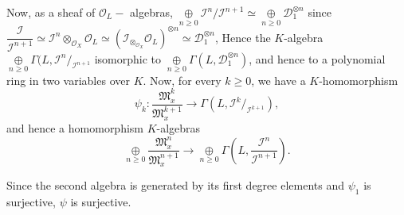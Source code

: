  Now, as a sheaf of $\mathscr{O}_L-$ algebras, $\underset{n \ge
   0}\oplus  \mathscr{I}^n / \mathscr{I}^{n+1} \simeq \underset{n \ge
   0} \oplus \mathscr{D}^{\otimes n}_1 $ since
 $\dfrac{\mathscr{I}}{\mathscr{I}^{n+1}} \simeq \mathscr{I}^n \otimes
 _{\mathscr{O}_X} \mathscr{O}_L \simeq(
 \mathscr{I}_{\otimes_{\mathscr{O}_X}} \mathscr{O}_L )^{\otimes n}
 \simeq \mathscr{D}_1^{\otimes n}$, Hence the $K$-algebra $\underset{n
   \ge 0}\oplus \Gamma (L, \mathscr{I}^n / _{\mathscr{I}^{n+1}}$
 isomorphic to $\underset{n \ge  0} \oplus \Gamma (L,
 \mathscr{D}_1^{\otimes n})$, and hence to a polynomial ring in two
 variables over  $K$. Now, for every $k \ge 0$, we have a
 $K$-homomorphism 
$$
\psi_k:
 \dfrac{\mathfrak{M}^k_x}{\mathfrak{M}^{k+1}_x} \to \Gamma (L, 
 \mathscr{I}^k /_{\mathscr{I}^{k+1}}),
$$
 and hence a homomorphism $K$-algebras 
 $$
 \underset{n \ge  0} \oplus  
 \dfrac{\mathfrak{M}^n_x}{\mathfrak{M}^{n+1}_x} \to \underset{n \ge  0}
 \oplus \Gamma \left(L, \dfrac{\mathscr{I}^n}{\mathscr{I}^{n+1}}\right).
 $$ 
 
 Since the second algebra is generated by its first degree elements
 and $\psi_1$ is surjective, $\psi$ is surjective. 
 

